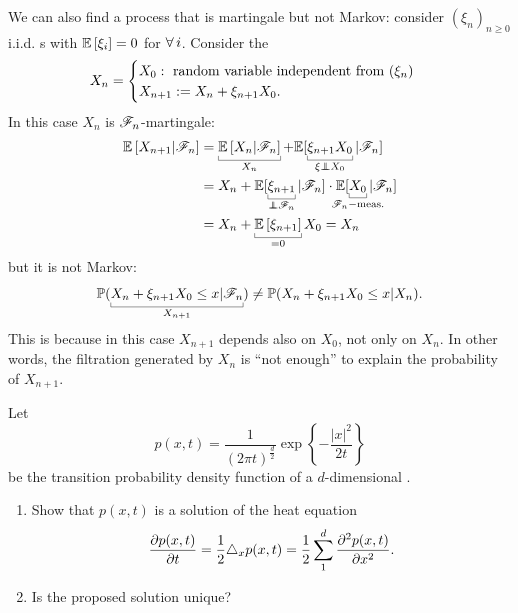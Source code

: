 \documentclass[12pt]{report}
\begin{document}
We can also find a process that is martingale but not Markov: consider ${(\xi_{n})}_{n\geq0}$ i.i.d. \rv s with $\mathbb{E}\left[\xi_{i}\right]=0$ for $\forall\, i$. Consider the \rv
\begin{equation*}
	X_{n}=\begin{cases}
		X_{0}:\text{ random variable{} independent from }(\xi_{n})\\
		X_{n+1}:=X_{n}+\xi_{n+1}X_{0}.
	\end{cases}
\end{equation*}
In this case $X_{n}$ is $\mathscr{F}_{n}$-martingale:
\begin{align*}
	\ev{X_{n+1}|\F_{n}}&=\ubracketthin{\ev{X_{n}|\F_{n}}}_{X_{n}}+\evn{\ubracketthin{\xi_{n+1}X_{0}}_{\xi\independent X_{0}}|\F_{n}}\\
	&=X_{n}+\evn{\ubracketthin{\xi_{n+1}}_{\independent\F_{n}}|\F_{n}}\cdot\evn{\ubracketthin{X_{0}}_{\mathclap{\F_{n}-\text{meas.}}}|\F_{n}}\\
	&=X_{n}+\ubracketthin{\ev{\xi_{n+1}}}_{=0}X_{0}=X_{n}
\end{align*}
but it is not Markov:
\begin{equation*}
	\pr(\ubracketthin{X_{n}+\xi_{n+1}X_{0}\leq x|\F_{n}}_{X_{n+1}})\neq\pr(X_{n}+\xi_{n+1}X_{0}\leq x|X_{n}).
\end{equation*}
This is because in this case $X_{n+1}$ depends also on $X_{0}$, not only on $X_{n}$. In other words, the filtration generated by $X_{n}$ is ``not enough'' to explain the probability of $X_{n+1}$.
\begin{exercise}
	Let
	\begin{equation*}
		p(x,t)=\frac{1}{(2\pi t)^{\frac{d}{2}}}\exp\left\{-\frac{|x|^{2}}{2t}\right\}
	\end{equation*} 
	be the transition probability density function of a $d$-dimensional \bwm.
	\begin{enumerate}
		\item Show that $p(x,t)$ is a solution of the heat equation
		\begin{equation*}
			\frac{\partial p(x,t)}{\partial t}=\frac{1}{2}\triangle_{x}p(x,t)=\frac{1}{2}\sum_{1}^{d}\frac{\partial^{2}p(x,t)}{\partial x^{2}}.
		\end{equation*}
		\item Is the proposed solution unique?
	\end{enumerate}
\end{exercise}
\end{document}
